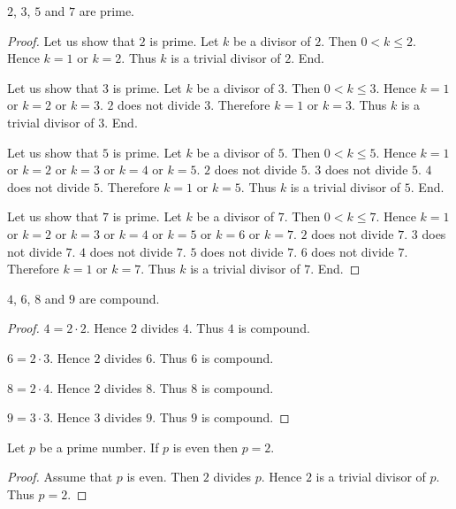 \documentclass[../../arithmetic.tex]{subfiles}
\begin{document}
  \begin{forthel}
    \begin{proposition}\label{Arithmetic_03_04_175431}
      $2$, $3$, $5$ and $7$ are prime.
    \end{proposition}
    \begin{proof}
      Let us show that $2$ is prime.
        Let $k$ be a divisor of $2$.
        Then $0 < k \leq 2$.
        Hence $k = 1$ or $k = 2$.
        Thus $k$ is a trivial divisor of $2$.
      End.

      Let us show that $3$ is prime.
        Let $k$ be a divisor of $3$.
        Then $0 < k \leq 3$.
        Hence $k = 1$ or $k = 2$ or $k = 3$.
        $2$ does not divide $3$.
        Therefore $k = 1$ or $k = 3$.
        Thus $k$ is a trivial divisor of $3$.
      End.

      Let us show that $5$ is prime.
        Let $k$ be a divisor of $5$.
        Then $0 < k \leq 5$.
        Hence $k = 1$ or $k = 2$ or $k = 3$ or $k = 4$ or $k = 5$.
        $2$ does not divide $5$.
        $3$ does not divide $5$.
        $4$ does not divide $5$.
        Therefore $k = 1$ or $k = 5$.
        Thus $k$ is a trivial divisor of $5$.
      End.

      Let us show that $7$ is prime.
        Let $k$ be a divisor of $7$.
        Then $0 < k \leq 7$.
        Hence $k = 1$ or $k = 2$ or $k = 3$ or $k = 4$ or $k = 5$ or $k = 6$ or $k = 7$.
        $2$ does not divide $7$.
        $3$ does not divide $7$.
        $4$ does not divide $7$.
        $5$ does not divide $7$.
        $6$ does not divide $7$.
        Therefore $k = 1$ or $k = 7$.
        Thus $k$ is a trivial divisor of $7$.
      End.
    \end{proof}

    \begin{proposition}\label{Arithmetic_03_04_985728}
      $4$, $6$, $8$ and $9$ are compound.
    \end{proposition}
    \begin{proof}
      $4 = 2 \cdot 2$.
      Hence $2$ divides $4$.
      Thus $4$ is compound.

      $6 = 2 \cdot 3$.
      Hence $2$ divides $6$.
      Thus $6$ is compound.

      $8 = 2 \cdot 4$.
      Hence $2$ divides $8$.
      Thus $8$ is compound.

      $9 = 3 \cdot 3$.
      Hence $3$ divides $9$.
      Thus $9$ is compound.
    \end{proof}

    \begin{proposition}\label{Arithmetic_03_04_520376}
      Let $p$ be a prime number.
      If $p$ is even then $p = 2$.
    \end{proposition}
    \begin{proof}
      Assume that $p$ is even.
      Then $2$ divides $p$.
      Hence $2$ is a trivial divisor of $p$.
      Thus $p = 2$.
    \end{proof}
  \end{forthel}
\end{document}
